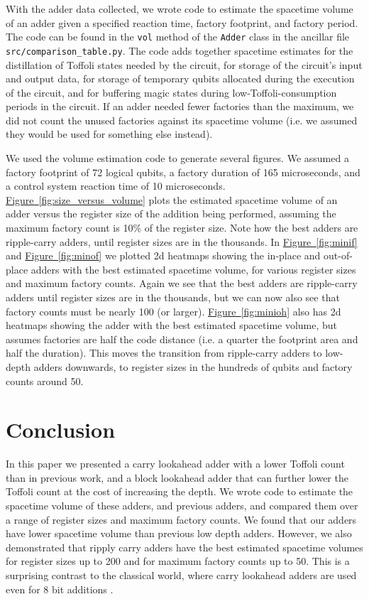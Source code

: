 \documentclass[onecolumn,unpublished]{quantumarticle}
\theoremstyle{definition}
\theoremstyle{definition}
\theoremstyle{definition}
\newcommand{\fig}[1]{\hyperref[fig:#1]{Figure~\ref*{fig:#1}}}
\begin{document}
With the adder data collected, we wrote code to estimate the spacetime volume of an adder given a specified reaction time, factory footprint, and factory period.
The code can be found in the \texttt{vol} method of the \texttt{Adder} class in the ancillar file \texttt{src/comparison\_table.py}.
The code adds together spacetime estimates for the distillation of Toffoli states needed by the circuit, for storage of the circuit's input and output data, for storage of temporary qubits allocated during the execution of the circuit, and for buffering magic states during low-Toffoli-consumption periods in the circuit.
If an adder needed fewer factories than the maximum, we did not count the unused factories against its spacetime volume (i.e. we assumed they would be used for something else instead).

We used the volume estimation code to generate several figures.
We assumed a factory footprint of 72 logical qubits, a factory duration of 165 microseconds, and a control system reaction time of 10 microseconds.
\fig{size_versus_volume} plots the estimated spacetime volume of an adder versus the register size of the addition being performed, assuming the maximum factory count is 10\% of the register size.
Note how the best adders are ripple-carry adders, until register sizes are in the thousands.
In \fig{minif} and \fig{minof} we plotted 2d heatmaps showing the in-place and out-of-place adders with the best estimated spacetime volume, for various register sizes and maximum factory counts.
Again we see that the best adders are ripple-carry adders until register sizes are in the thousands, but we can now also see that factory counts must be nearly 100 (or larger).
\fig{minioh} also has 2d heatmaps showing the adder with the best estimated spacetime volume, but assumes factories are half the code distance (i.e. a quarter the footprint area and half the duration).
This moves the transition from ripple-carry adders to low-depth adders downwards, to register sizes in the hundreds of qubits and factory counts around 50.

\section{Conclusion}
\label{sec:conclusion}

In this paper we presented a carry lookahead adder with a lower Toffoli count than in previous work, and a block lookahead adder that can further lower the Toffoli count at the cost of increasing the depth.
We wrote code to estimate the spacetime volume of these adders, and previous adders, and compared them over a range of register sizes and maximum factory counts.
We found that our adders have lower spacetime volume than previous low depth adders.
However, we also demonstrated that ripply carry adders have the best estimated spacetime volumes for register sizes up to 200 and for maximum factory counts up to 50.
This is a surprising contrast to the classical world, where carry lookahead adders are used even for 8 bit additions \cite{shirriff2020reverseengineer8008}.
\end{document}

